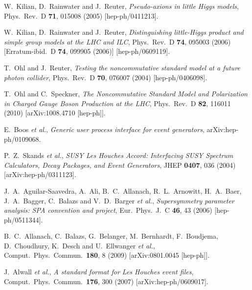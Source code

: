\documentclass[12pt]{book}
\begin{document}
\begin{thebibliography}{19}
  W.~Kilian, D.~Rainwater and J.~Reuter,
  {\em Pseudo-axions in little Higgs models},
  Phys.\ Rev.\ D {\bf 71}, 015008 (2005)
  [hep-ph/0411213].

  W.~Kilian, D.~Rainwater and J.~Reuter,
  {\em Distinguishing little-Higgs product and simple group models at
    the LHC and ILC},
  Phys.\ Rev.\ D {\bf 74}, 095003 (2006)
  [Erratum-ibid.\ D {\bf 74}, 099905 (2006)]
  [hep-ph/0609119].

  T.~Ohl and J.~Reuter,
  {\em Testing the noncommutative standard model at a future photon
    collider},
  Phys.\ Rev.\ D {\bf 70}, 076007 (2004)
  [hep-ph/0406098].

  T.~Ohl and C.~Speckner,
  {\em The Noncommutative Standard Model and Polarization in Charged
    Gauge Boson Production at the LHC},
  Phys.\ Rev.\ D {\bf 82}, 116011 (2010)
  [arXiv:1008.4710 [hep-ph]].

  E.~Boos {\it et al.},
  {\em Generic user process interface for event generators},
  arXiv:hep-ph/0109068.

  P.~Z.~Skands {\it et al.},
  {\em SUSY Les Houches Accord: Interfacing SUSY Spectrum Calculators, Decay
  Packages, and Event Generators},
  JHEP {\bf 0407}, 036 (2004)
  [arXiv:hep-ph/0311123].

  J.~A.~Aguilar-Saavedra, A.~Ali, B.~C.~Allanach, R.~L.~Arnowitt, H.~A.~Baer, J.~A.~Bagger, C.~Balazs and V.~D.~Barger {\it et al.},
  {\em Supersymmetry parameter analysis: SPA convention and project},
  Eur.\ Phys.\ J.\ C {\bf 46}, 43 (2006)
  [hep-ph/0511344].

  B.~C.~Allanach, C.~Balazs, G.~Belanger, M.~Bernhardt, F.~Boudjema, D.~Choudhury, K.~Desch and U.~Ellwanger {\it et al.},
  Comput.\ Phys.\ Commun.\  {\bf 180}, 8 (2009)
  [arXiv:0801.0045 [hep-ph]].

  J.~Alwall {\it et al.},
  {\em A standard format for Les Houches event files},
  Comput.\ Phys.\ Commun.\  {\bf 176}, 300 (2007)
  [arXiv:hep-ph/0609017].


\end{thebibliography}
\end{document}
